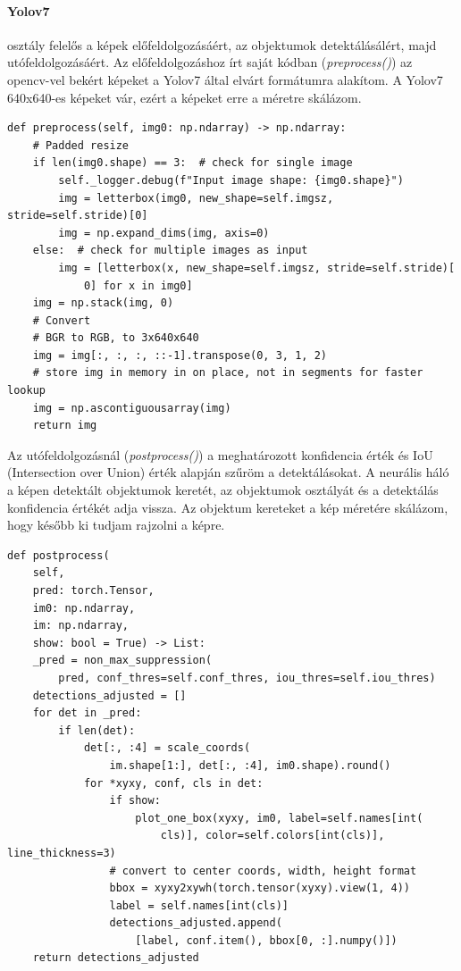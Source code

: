 \documentclass[12pt,a4paper]{article}
\begin{document}
\paragraph{Yolov7} osztály felelős a képek előfeldolgozásáért, az objektumok detektálásálért, majd utófeldolgozásáért.
Az előfeldolgozáshoz írt saját kódban (\textit{preprocess()}) az opencv-vel bekért képeket a Yolov7 által elvárt formátumra alakítom.
A Yolov7 640x640-es képeket vár, ezért a képeket erre a méretre skálázom.
\begin{verbatim}
def preprocess(self, img0: np.ndarray) -> np.ndarray:
    # Padded resize
    if len(img0.shape) == 3:  # check for single image
        self._logger.debug(f"Input image shape: {img0.shape}")
        img = letterbox(img0, new_shape=self.imgsz, stride=self.stride)[0]
        img = np.expand_dims(img, axis=0)
    else:  # check for multiple images as input
        img = [letterbox(x, new_shape=self.imgsz, stride=self.stride)[
            0] for x in img0]
    img = np.stack(img, 0)
    # Convert
    # BGR to RGB, to 3x640x640
    img = img[:, :, :, ::-1].transpose(0, 3, 1, 2)
    # store img in memory in on place, not in segments for faster lookup
    img = np.ascontiguousarray(img)
    return img
\end{verbatim}

Az utófeldolgozásnál (\textit{postprocess()}) a meghatározott konfidencia érték és IoU (Intersection over Union) érték alapján szűröm a detektálásokat.
A neurális háló a képen detektált objektumok keretét, az objektumok osztályát és a detektálás konfidencia értékét adja vissza.
Az objektum kereteket a kép méretére skálázom, hogy később ki tudjam rajzolni a képre.
\begin{verbatim}
def postprocess(
    self, 
    pred: torch.Tensor, 
    im0: np.ndarray, 
    im: np.ndarray, 
    show: bool = True) -> List:
    _pred = non_max_suppression(
        pred, conf_thres=self.conf_thres, iou_thres=self.iou_thres)
    detections_adjusted = []
    for det in _pred:
        if len(det):
            det[:, :4] = scale_coords(
                im.shape[1:], det[:, :4], im0.shape).round()
            for *xyxy, conf, cls in det:
                if show:
                    plot_one_box(xyxy, im0, label=self.names[int(
                        cls)], color=self.colors[int(cls)], line_thickness=3)
                # convert to center coords, width, height format
                bbox = xyxy2xywh(torch.tensor(xyxy).view(1, 4))
                label = self.names[int(cls)]
                detections_adjusted.append(
                    [label, conf.item(), bbox[0, :].numpy()])
    return detections_adjusted
\end{verbatim}
\end{document}
